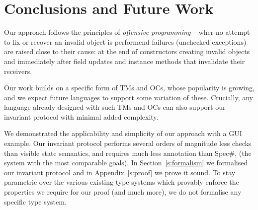 
\section{Conclusions and Future Work}
\label{s:conclusion}
Our approach follows the principles of \emph{offensive programming}
~\cite{stephens2015beginning}\IODel{,} wher
no attempt to fix or recover an invalid object is performend
 failures (unchecked exceptions)
		are raised close to their cause: at the end of constructors creating invalid objects and immediately after field updates and instance methods that invalidate their receivers.



Our work builds on a specific form of TMs and OCs, whose
popularity is growing, and we expect future languages to support some variation of these.
Crucially, any language already designed with such TMs and OCs
can also support our invariant protocol with minimal added complexity.


We demonstrated the applicability and simplicity of our approach with a GUI example.
Our invariant protocol performs several orders of magnitude less checks than visible state semantics, and requires much less annotation 
than Spec\#, (the system with the most comparable goals). In Section~\ref{s:formalism} we formalised our invariant protocol and in Appendix~\ref{s:proof} we prove it sound.
To stay parametric over the various existing type systems which provably enforce the properties we require for our proof (and much more), we do not formalise any specific type system.




